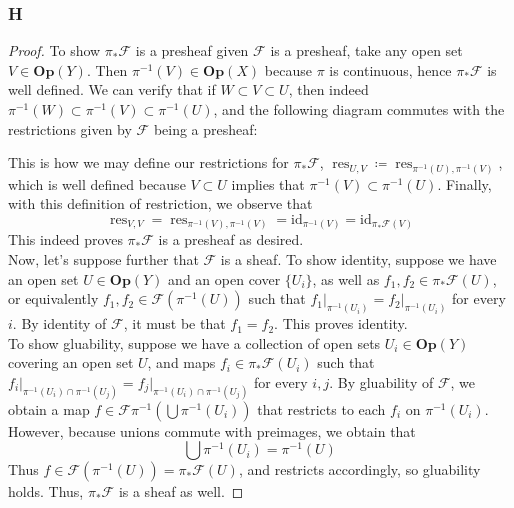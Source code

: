 \documentclass{article}
\newcommand{\id}{\mathrm{id}}
\newcommand{\fF}{\mathscr{F}}
\DeclareMathOperator{\res}{res}
\newcommand{\Op}{\mathbf{Op}} %
\begin{document}
\subsubsection{H}\label{2.2.H}
\begin{proof}
    To show $\pi_* \fF$ is a presheaf given $\fF$ is a presheaf, take any open set $V\in \Op(Y)$. Then $\pi^{-1}(V)\in \Op(X)$ because $\pi$ is continuous, hence $\pi_* \fF$ is well defined. We can verify that if $W\subset V\subset U$, then indeed $\pi^{-1}(W)\subset \pi^{-1}(V)\subset \pi^{-1}(U)$, and the following diagram commutes with the restrictions given by $\fF$ being a presheaf:
    \begin{center}
    \end{center}
    This is how we may define our restrictions for $\pi_* \fF$, $\res_{U,V}\coloneqq \res_{\pi^{-1}(U),\pi^{-1}(V)}$, which is well defined because $V\subset U$ implies that $\pi^{-1}(V)\subset \pi^{-1}(U)$. Finally, with this definition of restriction, we observe that
    \[\res_{V,V}=\res_{\pi^{-1}(V),\pi^{-1}(V)}=\id_{\pi^{-1}(V)}=\id_{\pi_\ast\fF(V)}
    \]
    This indeed proves $\pi_*\fF$ is a presheaf as desired.\\
    \indent Now, let's suppose further that $\fF$ is a sheaf. To show identity, suppose we have an open set $U\in \Op(Y)$ and an open cover $\{U_i\}$, as well as $f_1,f_2\in \pi_*\fF(U)$, or equivalently $f_1,f_2\in \fF(\pi^{-1}(U))$ such that $f_1\vert_{\pi^{-1}(U_i)}=f_2\vert_{\pi^{-1}(U_i)}$ for every $i$. By identity of $\fF$, it must be that $f_1=f_2$. This proves identity.\\
    \indent To show gluability, suppose we have a collection of open sets $U_i\in \Op(Y)$ covering an open set $U$, and maps $f_i\in \pi_* \fF(U_i)$ such that $f_i\vert_{\pi^{-1}(U_i)\cap \pi^{-1}(U_j)}=f_j\vert_{\pi^{-1}(U_i)\cap \pi^{-1}(U_j)}$ for every $i,j$. By gluability of $\fF$, we obtain a map $f\in \fF \pi^{-1}(\bigcup \pi^{-1}(U_i))$ that restricts to each $f_i$ on $\pi^{-1}(U_i)$. However, because unions commute with preimages, we obtain that
    \[
    \bigcup \pi^{-1}(U_i)=\pi^{-1}(U)
    \]
    Thus $f\in \fF(\pi^{-1}(U))=\pi_*\fF(U)$, and restricts accordingly, so gluability holds. Thus, $\pi_*\fF$ is a sheaf as well.
\end{proof}
\end{document}
